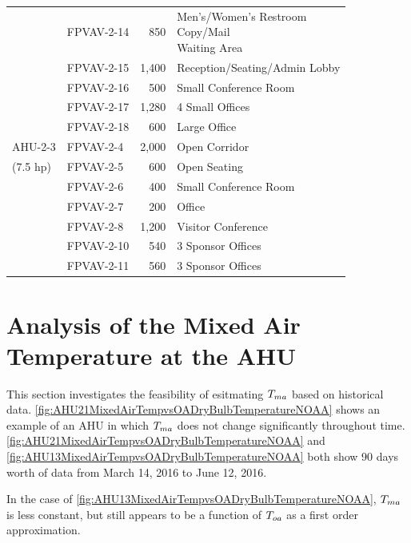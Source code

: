 \begin{table}[]
\begin{tabular}{@{}llrl@{}}
               & FPVAV-2-14 & 850 & \pbox{\textwidth}{Men's/Women's Restroom \\ Copy/Mail \\ Waiting Area }\\  \cmidrule(r){2-4}
               & FPVAV-2-15 & 1,400 & Reception/Seating/Admin Lobby \\  \cmidrule(r){2-4}
               & FPVAV-2-16 & 500 & Small Conference Room \\  \cmidrule(r){2-4}
               & FPVAV-2-17 & 1,280 & 4 Small Offices \\  \cmidrule(r){2-4}
               & FPVAV-2-18 & 600 & Large Office \\\midrule
AHU-2-3  & FPVAV-2-4 & 2,000 & Open Corridor \\  \cmidrule(r){2-4}
        (7.5 hp)       & FPVAV-2-5 & 600 & Open Seating \\  \cmidrule(r){2-4}
               & FPVAV-2-6 & 400 & Small Conference Room \\  \cmidrule(r){2-4}
               & FPVAV-2-7 & 200 & Office \\  \cmidrule(r){2-4}
               & FPVAV-2-8 & 1,200 & Visitor Conference \\  \cmidrule(r){2-4}
               & FPVAV-2-10 & 540 & 3 Sponsor Offices \\  \cmidrule(r){2-4}
               & FPVAV-2-11 & 560 & 3 Sponsor Offices \\ \bottomrule
\end{tabular}
\end{table}


\section{Analysis of the Mixed Air Temperature at the AHU}

This section investigates the feasibility of esitmating \(T_{ma}\) based on historical data. \figref{} \ref{fig:AHU21MixedAirTempvsOADryBulbTemperatureNOAA} shows an example of an AHU in which \(T_{ma}\) does not change significantly throughout time. \figref{} \ref{fig:AHU21MixedAirTempvsOADryBulbTemperatureNOAA} and \ref{fig:AHU13MixedAirTempvsOADryBulbTemperatureNOAA} both show 90 days worth of data from March 14, 2016 to June 12, 2016. 

In the case of \figref{} \ref{fig:AHU13MixedAirTempvsOADryBulbTemperatureNOAA}, \(T_{ma}\) is less constant, but still appears to be a function of \(T_{oa}\) as a first order approximation. 


